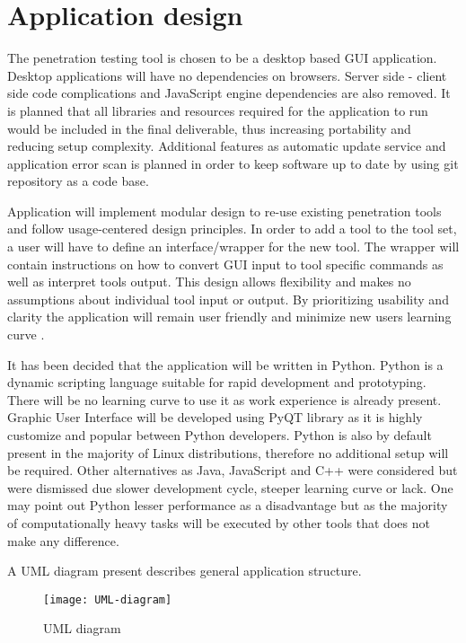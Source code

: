 \section{Application design}
The penetration testing tool is chosen to be a desktop based GUI application. Desktop applications will have no dependencies on browsers. Server side - client side code complications and JavaScript engine dependencies are also removed. It is planned that all libraries and resources required for the application to run would be included in the final deliverable, thus increasing portability and reducing setup complexity. Additional features as automatic update service and application error scan is planned in order to keep software up to date by using git repository as a code base.

Application will implement modular design to re-use existing penetration tools and follow usage-centered design principles. In order to add a tool to the tool set, a user will have to define an interface/wrapper for the new tool. The wrapper will contain instructions on how to convert GUI input to tool specific commands as well as interpret tools output. This design allows flexibility and makes no assumptions about individual tool input or output. By prioritizing usability and clarity the application will remain user friendly and minimize new users learning curve \cite{user}.

It has been decided that the application will be written in Python. Python is a dynamic scripting language suitable for rapid development and prototyping. There will be no learning curve to use it as work experience is already present. Graphic User Interface will be developed using PyQT library as it is highly customize and popular between Python developers. Python is also by default present in the majority of Linux distributions, therefore no additional setup will be required. Other alternatives as Java, JavaScript and C++ were considered but were dismissed due slower development cycle, steeper learning curve or lack. One may point out Python lesser performance as a disadvantage but as the majority of computationally heavy tasks will be executed by other tools that does not make any difference.

A UML diagram present describes general application structure.

\begin{figure}[h!]
\caption{UML diagram}
\texttt{[image: UML-diagram]}
\centering
\end{figure}

